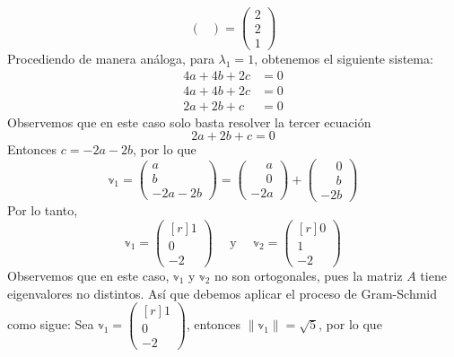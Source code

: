 \begin{example}
$$\begin{pmatrix}
    \end{pmatrix} = \begin{pmatrix}
        2 \\
        2 \\
        1
    \end{pmatrix}$$
    Procediendo de manera análoga, para $\lambda_1 = 1$, obtenemos el siguiente sistema:
    \begin{align*}
        4a + 4b + 2c & = 0 \\
        4a + 4b + 2c & = 0 \\
        2a + 2b + c & = 0
    \end{align*}
    Observemos que en este caso solo basta resolver la tercer ecuación
    $$2a + 2b + c = 0$$
    Entonces $c = -2a - 2b$, por lo que
    $$\mathbb{v}_1 = \begin{pmatrix}
        a \\
        b \\
        -2a -2b
    \end{pmatrix} = \begin{pmatrix}
        \phantom{-} a \\
        \phantom{-} 0 \\
        -2a
    \end{pmatrix} + \begin{pmatrix}
        \phantom{-} 0 \\
        \phantom{-} b \\
        -2b
    \end{pmatrix}$$
    Por lo tanto,
    $$\mathbb{v}_1 = \begin{pmatrix*}[r]
        1 \\
        0 \\
        -2
    \end{pmatrix*} \quad \text{ y } \quad \mathbb{v}_2 = \begin{pmatrix*}[r]
        0 \\
        1 \\
        -2
    \end{pmatrix*}$$
    Observemos que en este caso, $\mathbb{v}_1$ y $\mathbb{v}_2$ no son ortogonales, pues la matriz $A$ tiene eigenvalores no distintos. Así que debemos aplicar el proceso de Gram-Schmid como sigue: Sea $\mathbb{v}_1 = \begin{pmatrix*}[r]
        1 \\
        0 \\
        -2
    \end{pmatrix*}$, entonces $\| \mathbb{v}_1 \| = \sqrt{5}$, por lo que

\end{example}
